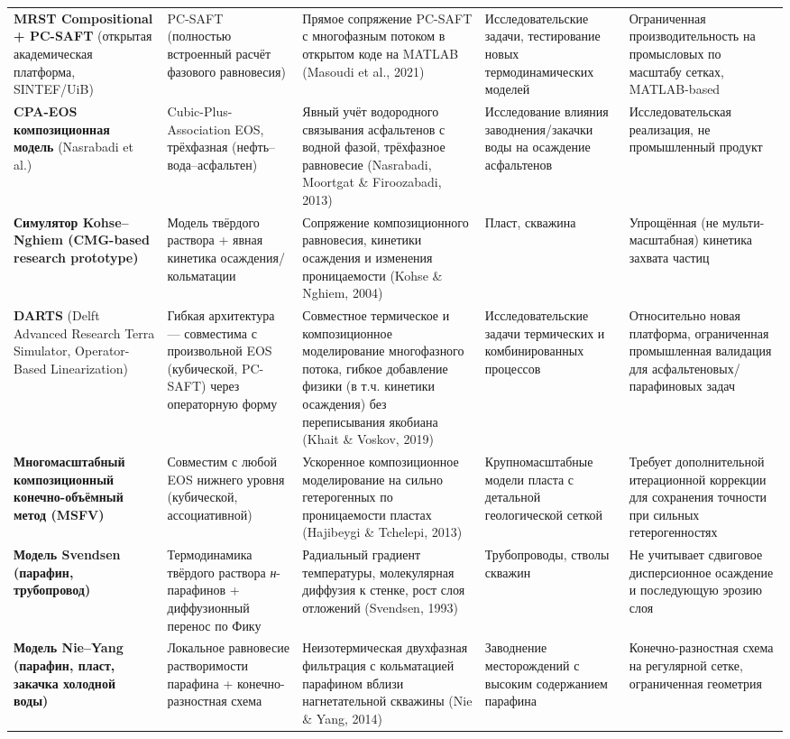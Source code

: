 \documentclass[11pt]{extarticle}
\begin{document}
{\begin{xltabular}{\linewidth}{@{}
  >{\raggedright\arraybackslash}X
  >{\raggedright\arraybackslash}X
  >{\raggedright\arraybackslash}X
  >{\raggedright\arraybackslash}X
  >{\raggedright\arraybackslash}X@{}}
\textbf{MRST Compositional + PC-SAFT} (открытая академическая платформа, SINTEF/UiB) & PC-SAFT (полностью встроенный расчёт фазового равновесия) & Прямое сопряжение PC-SAFT с многофазным потоком в открытом коде на MATLAB (Masoudi et al., 2021) & Исследовательские задачи, тестирование новых термодинамических моделей & Ограниченная производительность на промысловых по масштабу сетках, MATLAB-based \\
\textbf{CPA-EOS композиционная модель} (Nasrabadi et al.) & Cubic-Plus-Association EOS, трёхфазная (нефть--вода--асфальтен) & Явный учёт водородного связывания асфальтенов с водной фазой, трёхфазное равновесие (Nasrabadi, Moortgat \& Firoozabadi, 2013) & Исследование влияния заводнения/закачки воды на осаждение асфальтенов & Исследовательская реализация, не промышленный продукт \\
\textbf{Симулятор Kohse--Nghiem (CMG-based research prototype)} & Модель твёрдого раствора + явная кинетика осаждения/кольматации & Сопряжение композиционного равновесия, кинетики осаждения и изменения проницаемости (Kohse \& Nghiem, 2004) & Пласт, скважина & Упрощённая (не мульти-масштабная) кинетика захвата частиц \\
\textbf{DARTS} (Delft Advanced Research Terra Simulator, Operator-Based Linearization) & Гибкая архитектура --- совместима с произвольной EOS (кубической, PC-SAFT) через операторную форму & Совместное термическое и композиционное моделирование многофазного потока, гибкое добавление физики (в т.ч. кинетики осаждения) без переписывания якобиана (Khait \& Voskov, 2019) & Исследовательские задачи термических и комбинированных процессов & Относительно новая платформа, ограниченная промышленная валидация для асфальтеновых/парафиновых задач \\
\textbf{Многомасштабный композиционный конечно-объёмный метод (MSFV)} & Совместим с любой EOS нижнего уровня (кубической, ассоциативной) & Ускоренное композиционное моделирование на сильно гетерогенных по проницаемости пластах (Hajibeygi \& Tchelepi, 2013) & Крупномасштабные модели пласта с детальной геологической сеткой & Требует дополнительной итерационной коррекции для сохранения точности при сильных гетерогенностях \\
\textbf{Модель Svendsen (парафин, трубопровод)} & Термодинамика твёрдого раствора \emph{н}-парафинов + диффузионный перенос по Фику & Радиальный градиент температуры, молекулярная диффузия к стенке, рост слоя отложений (Svendsen, 1993) & Трубопроводы, стволы скважин & Не учитывает сдвиговое дисперсионное осаждение и последующую эрозию слоя \\
\textbf{Модель Nie--Yang (парафин, пласт, закачка холодной воды)} & Локальное равновесие растворимости парафина + конечно-разностная схема & Неизотермическая двухфазная фильтрация с кольматацией парафином вблизи нагнетательной скважины (Nie \& Yang, 2014) & Заводнение месторождений с высоким содержанием парафина & Конечно-разностная схема на регулярной сетке, ограниченная геометрия \\
\end{xltabular}
}
\end{document}
